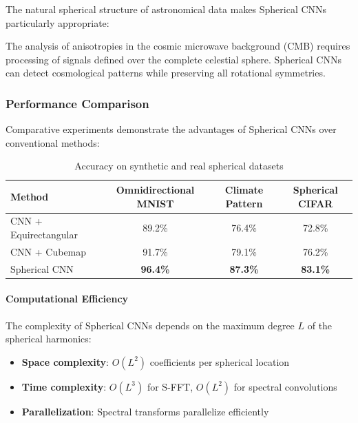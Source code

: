 The natural spherical structure of astronomical data makes Spherical CNNs particularly appropriate:

\begin{example}
The analysis of anisotropies in the cosmic microwave background (CMB) requires processing of signals defined over the complete celestial sphere. Spherical CNNs can detect cosmological patterns while preserving all rotational symmetries.
\end{example}

\subsubsection{Performance Comparison}

Comparative experiments demonstrate the advantages of Spherical CNNs over conventional methods:

\begin{table}[h]
\centering
\begin{tabular}{|l|c|c|c|}
\hline
\textbf{Method} & \textbf{Omnidirectional MNIST} & \textbf{Climate Pattern} & \textbf{Spherical CIFAR} \\
\hline
CNN + Equirectangular & 89.2\% & 76.4\% & 72.8\% \\
CNN + Cubemap & 91.7\% & 79.1\% & 76.2\% \\
Spherical CNN & \textbf{96.4\%} & \textbf{87.3\%} & \textbf{83.1\%} \\
\hline
\end{tabular}
\caption{Accuracy on synthetic and real spherical datasets}
\label{tab:spherical_performance}
\end{table}

\paragraph{Computational Efficiency}

The complexity of Spherical CNNs depends on the maximum degree $L$ of the spherical harmonics:

\begin{itemize}
    \item \textbf{Space complexity}: $O(L^2)$ coefficients per spherical location
    \item \textbf{Time complexity}: $O(L^3)$ for S-FFT, $O(L^2)$ for spectral convolutions
    \item \textbf{Parallelization}: Spectral transforms parallelize efficiently
\end{itemize}

